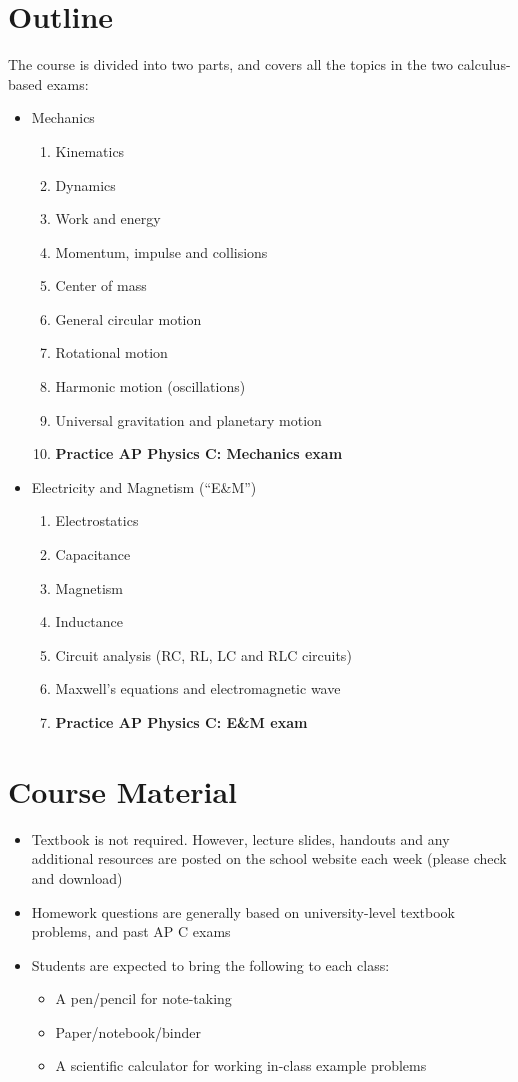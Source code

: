 \documentclass{../../oss-handout}
\begin{document}
\section*{Outline}
The course is divided into two parts, and covers all the topics in the two
calculus-based exams:
\begin{itemize}[nosep]
\item Mechanics
  \begin{enumerate}[nosep]
  \item Kinematics
  \item Dynamics
  \item Work and energy
  \item Momentum, impulse and collisions
  \item Center of mass
  \item General circular motion
  \item Rotational motion
  \item Harmonic motion (oscillations)
  \item Universal gravitation and planetary motion
  \item\textbf{Practice AP Physics C: Mechanics exam}
  \end{enumerate}
\item Electricity and Magnetism (``E\&M'')
  \begin{enumerate}[noitemsep,topsep=0pt,resume]
  \item Electrostatics
  \item Capacitance
  \item Magnetism
  \item Inductance
  \item Circuit analysis (RC, RL, LC and RLC circuits)
  \item Maxwell's equations and electromagnetic wave
  \item\textbf{Practice AP Physics C: E\&M exam}
  \end{enumerate}
\end{itemize}

\section*{Course Material}
\begin{itemize}[nosep]
\item Textbook is not required. However, lecture slides, handouts and any
  additional resources are posted on the school website each week (please check
  and download)
\item Homework questions are generally based on university-level textbook
  problems, and past AP C exams
\item Students are expected to bring the following to each class:
  \begin{itemize}[nosep]
  \item A pen/pencil for note-taking
  \item Paper/notebook/binder
  \item A scientific calculator for working in-class example problems
  \end{itemize}
\end{itemize}
\end{document}

